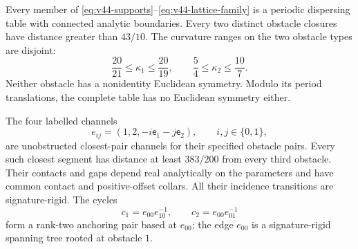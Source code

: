 \begin{theorem}
\label{thm:v44-realized-family}
Every member of \eqref{eq:v44-supports}--\eqref{eq:v44-lattice-family}
is a periodic dispersing table with connected analytic boundaries.
Every two distinct obstacle closures have distance greater than $43/10$.
The curvature ranges on the two obstacle types are disjoint:
\begin{equation}\label{eq:v44-curvature-bounds}
 \frac{20}{21}\le\kappa_1\le\frac{20}{19},\qquad
 \frac54\le\kappa_2\le\frac{10}{7}.
\end{equation}
Neither obstacle has a nonidentity Euclidean symmetry.  Modulo its period
translations, the complete table has no Euclidean symmetry either.

The four labelled channels
\begin{equation}\label{eq:v44-channel-labels}
 e_{ij}=(1,2,-i\mathsf e_1-j\mathsf e_2),\qquad i,j\in\{0,1\},
\end{equation}
are unobstructed closest-pair channels for their specified obstacle pairs.
Every such closest segment has distance at least $383/200$ from every
third obstacle.  Their contacts and gaps depend real analytically on the
parameters and have common contact and positive-offset collars.
All their incidence transitions are signature-rigid.  The cycles
\begin{equation}\label{eq:v44-cycles}
 c_1=e_{00}e_{10}^{-1},\qquad c_2=e_{00}e_{01}^{-1}
\end{equation}
form a rank-two anchoring pair based at $e_{00}$; the edge $e_{00}$ is a
signature-rigid spanning tree rooted at obstacle $1$.
\end{theorem}


